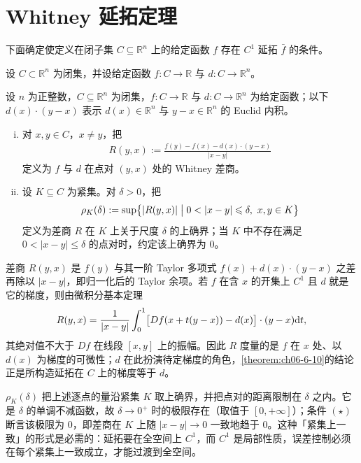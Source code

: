 \documentclass[../../main.tex]{subfiles}%
\begin{document}
\section{Whitney 延拓定理}\label{section:ch06-05}

下面确定使定义在闭子集 $C\subseteq\mathbb{R}^n$ 上的给定函数 $f$ 存在 $C^1$ 延拓 $\bar f$ 的条件。

设 $C\subset\mathbb{R}^n$ 为闭集，并设给定函数 $f:C\to\mathbb{R}$ 与 $d:C\to\mathbb{R}^n$。

\begin{definition*}
\label{definition:ch06-def-6-10-记号}
设 $n$ 为正整数，$C\subseteq\mathbb{R}^n$ 为闭集，$f:C\to\mathbb{R}$ 与 $d:C\to\mathbb{R}^n$ 为给定函数；以下 $d(x)\cdot(y-x)$ 表示 $d(x)\in\mathbb{R}^n$ 与 $y-x\in\mathbb{R}^n$ 的 Euclid 内积。
\begin{enumerate}[(i)]
\item 对 $x,y\in C$，$x\neq y$，把
\begin{align*}
R(y,x):=\frac{f(y)-f(x)-d(x)\cdot(y-x)}{\lvert x-y\rvert}
\end{align*}
定义为 $f$ 与 $d$ 在点对 $(y,x)$ 处的 Whitney 差商。
\item 设 $K\subseteq C$ 为紧集。对 $\delta>0$，把
\begin{align*}
\rho_K(\delta):=\sup\bigl\{\lvert R(y,x)\rvert\bigm|0<\lvert x-y\rvert\leqslant\delta,\ x,y\in K\bigr\}
\end{align*}
定义为差商 $R$ 在 $K$ 上关于尺度 $\delta$ 的上确界；当 $K$ 中不存在满足 $0<\lvert x-y\rvert\leqslant\delta$ 的点对时，约定该上确界为 $0$。
\end{enumerate}
\end{definition*}

\begin{remark}\label{remark:ch06-def-6-10-记号-动机}
差商 $R(y,x)$ 是 $f(y)$ 与其一阶 Taylor 多项式 $f(x)+d(x)\cdot(y-x)$ 之差再除以 $\lvert x-y\rvert$，即归一化后的 Taylor 余项。若 $f$ 在含 $x$ 的开集上 $C^1$ 且 $d$ 就是它的梯度，则由微积分基本定理
\begin{align*}
R(y,x)=\frac{1}{\lvert x-y\rvert}\int_0^1\bigl[Df(x+t(y-x))-d(x)\bigr]\cdot(y-x)\mathrm{d} t,
\end{align*}
其绝对值不大于 $Df$ 在线段 $[x,y]$ 上的振幅。因此 $R$ 度量的是 $f$ 在 $x$ 处、以 $d(x)$ 为梯度的可微性；$d$ 在此扮演待定梯度的角色，\cref{theorem:ch06-6-10}的结论正是所构造延拓在 $C$ 上的梯度等于 $d$。%

$\rho_K(\delta)$ 把上述逐点的量沿紧集 $K$ 取上确界，并把点对的距离限制在 $\delta$ 之内。它是 $\delta$ 的单调不减函数，故 $\delta\to0^{+}$ 时的极限存在（取值于 $[0,+\infty]$）；条件 $(\star)$ 断言该极限为 $0$，即差商在 $K$ 上随 $\lvert x-y\rvert\to0$ 一致地趋于 $0$。这种「紧集上一致」的形式是必需的：延拓要在全空间上 $C^1$，而 $C^1$ 是局部性质，误差控制必须在每个紧集上一致成立，才能过渡到全空间。
\end{remark}
\end{document}
